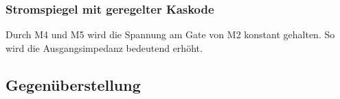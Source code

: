 \subsubsection{Stromspiegel mit geregelter Kaskode}


Durch M4 und M5 wird die Spannung am Gate von M2 konstant gehalten. 
So wird die Ausgangsimpedanz bedeutend erhöht.


\subsection{Gegenüberstellung}


